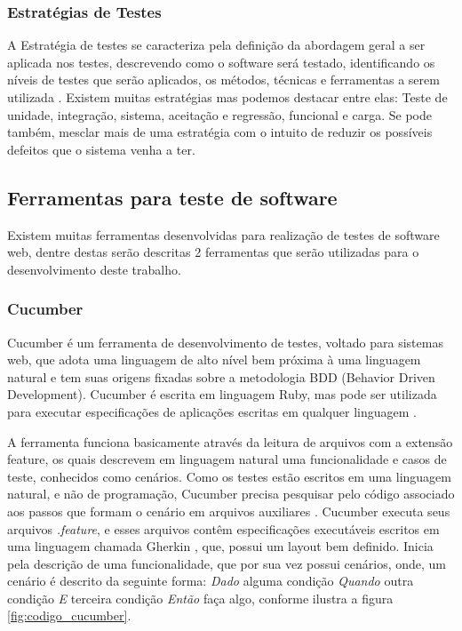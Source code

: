 \documentclass[12pt]{article}
\begin{document}
	\subsubsection{Estratégias de Testes}
	A Estratégia de testes se caracteriza pela definição da abordagem geral a ser aplicada nos testes, descrevendo como o software será testado, identificando os níveis de testes que serão aplicados, os métodos, técnicas e ferramentas a serem utilizada \cite{rios2006teste}. Existem muitas estratégias mas podemos destacar entre elas: Teste de unidade, integração, sistema, aceitação e regressão, funcional e carga. Se pode também, mesclar mais de uma estratégia com o intuito de reduzir os possíveis defeitos que o sistema venha a ter.	

	\subsection{Ferramentas para teste de software}
	Existem muitas ferramentas desenvolvidas para realização de testes de software web, dentre destas serão descritas 2 ferramentas que serão utilizadas para o desenvolvimento deste trabalho.

	\subsubsection{Cucumber}
	Cucumber é um ferramenta de desenvolvimento de testes, voltado para sistemas web, que adota uma linguagem de alto nível bem próxima à uma linguagem natural e tem suas origens fixadas sobre a metodologia BDD (Behavior Driven Development). Cucumber é escrita em linguagem Ruby, mas pode ser utilizada para executar especificações de aplicações escritas em qualquer linguagem \cite{nunescucumber}. 

	A ferramenta funciona basicamente através da leitura de arquivos com a extensão feature, os quais descrevem em linguagem natural uma funcionalidade e casos de teste, conhecidos como cenários.     
	Como os testes estão escritos em uma linguagem natural, e não de programação, Cucumber precisa pesquisar pelo código associado aos passos que formam o cenário em arquivos auxiliares \cite{scmitzcucumberreview}. Cucumber executa seus arquivos \emph{.feature}, e esses arquivos contêm especificações executáveis escritos em uma linguagem chamada Gherkin \cite{cucumberwiki}, que, possui um layout bem definido. Inicia pela descrição de uma funcionalidade, que por sua vez possui cenários, onde, um cenário é descrito da seguinte forma: \emph{Dado} alguma condição \emph{Quando} outra condição \emph{E} terceira condição \emph{Então} faça algo, conforme ilustra a figura \ref{fig:codigo_cucumber}.
\end{document}
